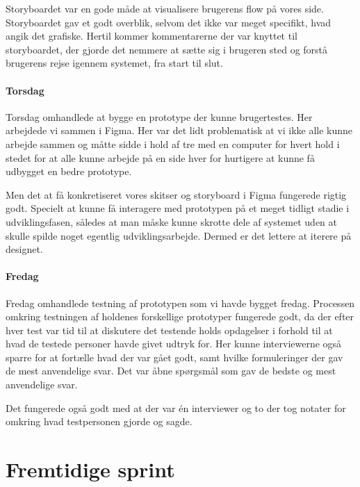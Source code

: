 \documentclass{article}
\begin{document}
Storyboardet var en gode måde at visualisere brugerens flow på vores side.
Storyboardet gav et godt overblik, selvom det ikke var meget specifikt, hvad
angik det grafiske. Hertil kommer kommentarerne der var knyttet til
storyboardet, der gjorde det nemmere at sætte sig i brugeren sted og forstå
brugerens rejse igennem systemet, fra start til slut.


\paragraph{Torsdag}

Torsdag omhandlede at bygge en prototype der kunne brugertestes. Her arbejdede
vi sammen i Figma. Her var det lidt problematisk at vi ikke alle kunne arbejde
sammen og måtte sidde i hold af tre med en computer for hvert hold i stedet for
at alle kunne arbejde på en side hver for hurtigere at kunne få udbygget en
bedre prototype.

Men det at få konkretiseret vores skitser og storyboard i Figma fungerede rigtig
godt. Specielt at kunne få interagere med prototypen på et meget tidligt stadie i
udviklingsfasen, således at man måske kunne skrotte dele af systemet uden at
skulle spilde noget egentlig udviklingsarbejde. Dermed er det lettere at iterere
på designet.

\paragraph{Fredag}
Fredag omhandlede testning af prototypen som vi havde bygget fredag. Processen
omkring testningen af holdenes forskellige prototyper fungerede godt, da der
efter hver test var tid til at diskutere det testende holds opdagelser i forhold
til at hvad de testede personer havde givet udtryk for. Her kunne interviewerne
også sparre for at fortælle hvad der var gået godt, samt hvilke formuleringer
der gav de mest anvendelige svar. Det var åbne spørgsmål som gav de bedste og
mest anvendelige svar.

Det fungerede også godt med at der var én interviewer og to der tog notater for
omkring hvad testpersonen gjorde og sagde.

\section{Fremtidige sprint}
\end{document}

